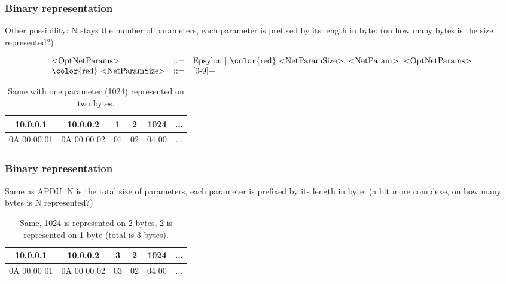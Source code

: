 \documentclass{beamer}
\begin{document}
\begin{frame}
    \frametitle{Binary representation}

    Other possibility: N stays the number of parameters, each parameter is prefixed by its length in byte: (on how many bytes is the size represented?)

    {\footnotesize
    \[
        \begin{array}{l r l}
            \text{<OptNetParams>}               & ::= & \text{Epsylon | {\color{red} <NetParamSize>}, <NetParam>, <OptNetParams>} \\
            \text{{\color{red} <NetParamSize>}} & ::= & \text{[0-9]+} \\
        \end{array}
    \]
    }
    \vfill   
    \begin{example}
        \begin{table}[htb]
            \centering
            \begin{tabular}{|c|c|c|c|c|c|}
                \hline
                10.0.0.1    & 10.0.0.2    & {\color{green} 1}  & {\color{blue} 2}  & 1024  & ... \\
                \hline
                0A 00 00 01 & 0A 00 00 02 & 01                 & 02                & 04 00 & ... \\
                \hline
            \end{tabular}
            \caption*{Same with {\color{green} one} parameter (1024) represented on {\color{blue} two} bytes.}
            \vspace{-1em}
        \end{table}
    \end{example}
\end{frame}

\begin{frame}
    \frametitle{Binary representation}

    Same as APDU: N is the total size of parameters, each parameter is prefixed by its length in byte: (a bit more complexe, on how many bytes is N represented?)
    \vfill
    \begin{example}
        \begin{table}[htb]
            \centering
            \begin{tabular}{|c|c|c|c|c|c|}
                \hline
                10.0.0.1    & 10.0.0.2    & 3  & 2                  & 1024                  & ... \\
                \hline
                0A 00 00 01 & 0A 00 00 02 & 03 & {\color{green} 02} & {\color{green} 04 00} & ... \\
                \hline
            \end{tabular}
            \caption*{Same, 1024 is represented on 2 bytes, 2 is represented on 1 byte (total is {\color{green} 3} bytes).}
            \vspace{-1em}
        \end{table}
    \end{example}
\end{frame}
\end{document}
